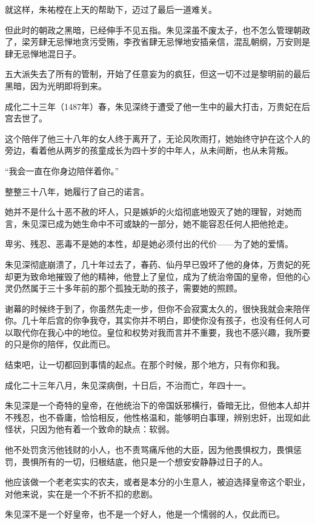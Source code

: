 \begin{multicols}{\theparacolNo}
就这样，朱祐樘在上天的帮助下，迈过了最后一道难关。

但此时的朝政之黑暗，已经伸手不见五指。朱见深虽不废太子，也不怎么管理朝政了，梁芳肆无忌惮地贪污受贿，李孜省肆无忌惮地安插亲信，混乱朝纲，万安则是肆无忌惮地混日子。

五大派失去了所有的管制，开始了任意妄为的疯狂，但这一切不过是黎明前的最后黑暗，因为光明即将到来。

成化二十三年（1487年）春，朱见深终于遭受了他一生中的最大打击，万贵妃在后宫去世了。

这个陪伴了他三十八年的女人终于离开了，无论风吹雨打，她始终守护在这个人的旁边，看着他从两岁的孩童成长为四十岁的中年人，从未间断，也从未背叛。

“我会一直在你身边陪伴着你。”

整整三十八年，她履行了自己的诺言。

她并不是什么十恶不赦的坏人，只是嫉妒的火焰彻底地毁灭了她的理智，对她而言，朱见深已成为她生命中不可或缺的一部分，她不能容忍任何人把他抢走。

卑劣、残忍、恶毒不是她的本性，却是她必须付出的代价——为了她的爱情。

朱见深彻底崩溃了，几十年过去了，春药、仙丹早已毁坏了他的身体，万贵妃的死却更为致命地摧毁了他的精神，他登上了皇位，成为了统治帝国的皇帝，但他的心灵仍然属于三十多年前的那个孤独无助的孩子，需要她的照顾。

谢幕的时候终于到了，你虽然先走一步，但你不会寂寞太久的，很快我就会来陪伴你。几十年后宫的你争我夺，其实你并不明白，即使你没有孩子，也没有任何人可以取代你在我心中的地位。皇位和权势对我而言并不重要，我也不感兴趣，我所要的只是你的陪伴，仅此而已。

结束吧，让一切都回到事情的起点。在那个时候，那个地方，只有你和我。

成化二十三年八月，朱见深病倒，十日后，不治而亡，年四十一。

朱见深是一个奇特的皇帝，在他统治下的帝国妖邪横行，昏暗无比，但他本人却并不残忍，也不昏庸，恰恰相反，他性格温和，能够明白事理，辨别忠奸，出现如此怪状，只因为他有着一个致命的缺点：软弱。

他不处罚贪污他钱财的小人，也不责骂痛斥他的大臣，因为他畏惧权力，畏惧惩罚，畏惧所有的一切，归根结底，他只是一个想安安静静过日子的人。

他应该做一个老老实实的农夫，或者是本分的小生意人，被迫选择皇帝这个职业，对他来说，实在是一个不折不扣的悲剧。

朱见深不是一个好皇帝，也不是一个好人，他是一个懦弱的人，仅此而已。
\ifnum{}
	\end{multicols}
\fi
\newpage
